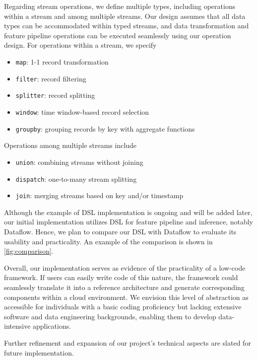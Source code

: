 Regarding stream operations, we define multiple types, including operations within a stream and among multiple streams. Our design assumes that all data types can be accommodated within typed streams, and data transformation and feature pipeline operations can be executed seamlessly using our operation design. For operations within a stream, we specify 
\begin{itemize}
    \item {\tt map}: 1-1 record transformation
    \item {\tt filter}: record filtering
    \item {\tt splitter}: record splitting
    \item {\tt window}: time window-based record selection
    \item {\tt groupby}: grouping records by key with aggregate functions
\end{itemize}
Operations among multiple streams include 
\begin{itemize}
    \item {\tt union}: combining streams without joining
    \item {\tt dispatch}: one-to-many stream splitting
    \item {\tt join}: merging streams based on key and/or timestamp
\end{itemize}


Although the example of DSL implementation is ongoing and will be added later, our initial implementation utilizes DSL for feature pipeline and inference, notably Dataflow. Hence, we plan to compare our DSL with Dataflow to evaluate its usability and practicality. An example of the comparison is shown in \autoref{fig:comparison}.

Overall, our implementation serves as evidence of the practicality of a low-code framework. If users can easily write code of this nature, the framework could seamlessly translate it into a reference architecture and generate corresponding components within a cloud environment. We envision this level of abstraction as accessible for individuals with a basic coding proficiency but lacking extensive software and data engineering backgrounds, enabling them to develop data-intensive applications.

Further refinement and expansion of our project's technical aspects are slated for future implementation.

